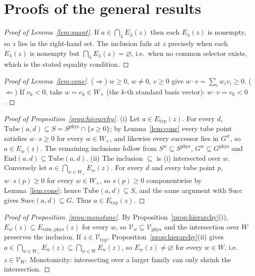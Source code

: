 \documentclass[preprint,11pt,authoryear]{elsarticle}
\theoremstyle{definition}
\theoremstyle{remark}
\newcommand{\Etyp}{E_{\mathrm{typ}}}
\newcommand{\Ephys}{E_{\mathrm{tube,phys}}}
\newcommand{\Vtyp}{\mathcal{V}_{\mathrm{typ}}}
\newcommand{\Vphys}{\mathcal{V}_{\mathrm{phys}}}
\newcommand{\Wp}{W_+}
\newcommand{\Tube}{\mathrm{Tube}}
\newcommand{\Succ}{\mathrm{Succ}}
\newcommand{\End}{\mathrm{End}}
\begin{document}
\appendix

\section{Proofs of the general results}\label{app:general}

\begin{proof}[Proof of Lemma~\ref{lem:quant}]
If $a\in\bigcap_\lambda E_\lambda(z)$ then each $E_\lambda(z)$ is nonempty, so $z$ lies in the right-hand set. The inclusion fails at $z$ precisely when each $E_\lambda(z)$ is nonempty but $\bigcap_\lambda E_\lambda(z)=\varnothing$, i.e.\ when no common selector exists, which is the stated equality condition.
\end{proof}

\begin{proof}[Proof of Lemma~\ref{lem:cone}]
($\Rightarrow$) $w\ge0$, $w\ne0$, $v\ge0$ give $w\cdot v=\sum_iw_iv_i\ge0$. ($\Leftarrow$) If $v_k<0$, take $w=e_k\in\Wp$ (the $k$-th standard basis vector): $w\cdot v=v_k<0$.
\end{proof}

\begin{proof}[Proof of Proposition~\ref{prop:hierarchy}]
(i) Let $a\in\Etyp(z)$. For every $d$, $\Tube(a,d)\subseteq S=S^{\mathrm{phys}}\cap\{s\ge0\}$; by Lemma~\ref{lem:cone} every tube point satisfies $w\cdot s\ge0$ for every $w\in\Wp$, and likewise every successor lies in $G^w$, so $a\in E_w(z)$. The remaining inclusions follow from $S^w\subseteq S^{\mathrm{phys}}$, $G^w\subseteq G^{\mathrm{phys}}$ and $\End(a,d)\subseteq\Tube(a,d)$.
(ii) The inclusion $\subseteq$ is (i) intersected over $w$. Conversely let $a\in\bigcap_{w\in\Wp}E_w(z)$. For every $d$ and every tube point $p$, $w\cdot s(p)\ge0$ for every $w\in\Wp$, so $s(p)\ge0$ componentwise by Lemma~\ref{lem:cone}; hence $\Tube(a,d)\subseteq S$, and the same argument with $\Succ$ gives $\Succ(a,d)\subseteq G$. Thus $a\in\Etyp(z)$.
\end{proof}

\begin{proof}[Proof of Proposition~\ref{prop:monotone}]
By Proposition~\ref{prop:hierarchy}(i), $E_w(z)\subseteq\Ephys(z)$ for every $w$, so $\mathcal V_w\subseteq\Vphys$ and the intersection over $W$ preserves the inclusion. If $z\in\Vtyp$, Proposition~\ref{prop:hierarchy}(ii) gives $a\in\bigcap_{w\in\Wp}E_w(z)\subseteq\bigcap_{w\in W}E_w(z)$, so $E_w(z)\ne\varnothing$ for every $w\in W$, i.e.\ $z\in\mathcal V_W$. Monotonicity: intersecting over a larger family can only shrink the intersection.
\end{proof}
\end{document}
